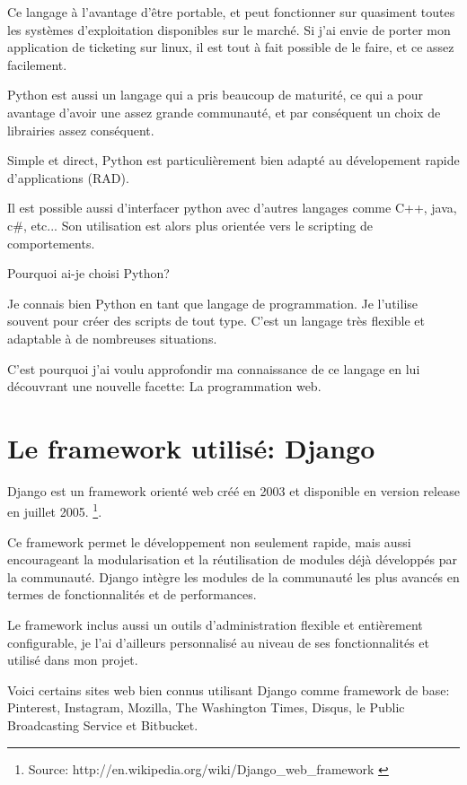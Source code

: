 \documentclass[12pt,table,a4paper]{report}
\begin{document}
Ce langage à l'avantage d'être portable, et peut fonctionner sur quasiment toutes les systèmes d'exploitation disponibles sur le marché. Si j'ai envie de porter mon application de ticketing sur linux, il est tout à fait possible de le faire, et ce assez facilement.

Python est aussi un langage qui a pris beaucoup de maturité, ce qui a pour avantage d'avoir une assez grande communauté, et par conséquent un choix de librairies assez conséquent.

Simple et direct, Python est particulièrement bien adapté au dévelopement rapide d'applications (RAD).

Il est possible aussi d'interfacer python avec d'autres langages comme C++, java, c\#, etc... Son utilisation est alors plus orientée vers le scripting de comportements.

\begin{center}
Pourquoi ai-je choisi Python? 
\end{center}

Je connais bien Python en tant que langage de programmation. Je l'utilise souvent pour créer des scripts de tout type. C'est un langage très flexible et adaptable à de nombreuses situations.

C'est pourquoi j'ai voulu approfondir ma connaissance de ce langage en lui découvrant une nouvelle facette: La programmation web.

\section{Le framework utilisé: Django}
Django est un framework orienté web créé en 2003 et disponible en version release en juillet 2005. \footnote{Source: http://en.wikipedia.org/wiki/Django\_web\_framework \label{DjangoWikipediaArticle}}.

Ce framework permet le développement non seulement rapide, mais aussi encourageant la modularisation et la réutilisation de modules déjà développés par la communauté. Django intègre les modules de la communauté les plus avancés en termes de fonctionnalités et de performances.

Le framework inclus aussi un outils d'administration flexible et entièrement configurable, je l'ai d'ailleurs personnalisé au niveau de ses fonctionnalités et utilisé dans mon projet.

Voici certains sites web bien connus utilisant Django comme framework de base: Pinterest, Instagram, Mozilla, The Washington Times, Disqus, le Public Broadcasting Service et Bitbucket. 
\end{document}

